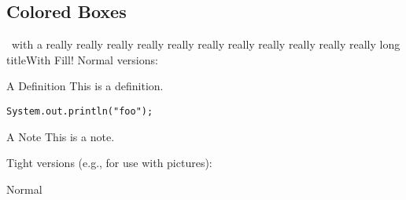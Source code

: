 \documentclass[
	aspectratio=169, %
	8pt, %
]{beamer}
\begin{document}
\subsection{Colored Boxes}
\begin{frame}[fragile]{\insertsubsection\ with a really really really really really really really really really really really long title\hfill With Fill!}
	Normal versions:

\begin{mycolumns}[columns=3]
		\begin{definition}{A Definition}
			This is a definition.
\begin{verbatim}
System.out.println("foo");
\end{verbatim}
		\end{definition}
\mynextcolumn
\mynextcolumn
		\begin{note}{A Note}
			This is a note.
		\end{note}
\end{mycolumns}
	\vfill

	Tight versions (e.g., for use with pictures):

\end{frame}

\begin{frame}{Normal}
	\begin{mycolumns}[columns=5,widths={50},animation=keep]
	\mynextcolumn
	\mynextcolumn
	\mynextcolumn
	\mynextcolumn
	\end{mycolumns}
	\begin{mycolumns}[columns=4,widths={30, 50},animation=forget,reverse]
	\mynextcolumn
	\mynextcolumn
	\mynextcolumn
	\end{mycolumns}
\end{frame}
\end{document}
